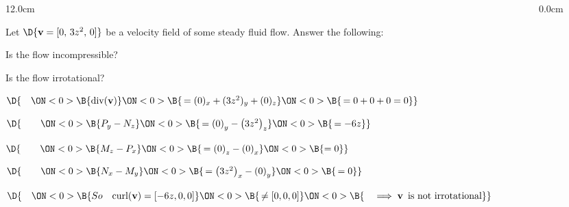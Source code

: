 \begin{frame}
\frametitle{}
\scriptsize
\begin{columns}\begin{column}{12.0cm}

\EX Let $\D{{\bf v} = [0,\, 3z^2,\, 0]}$ be a velocity field of some steady fluid flow.  Answer the following:

\vspace{0.1cm} 

\OBUL Is the flow incompressible?  \quad
{}

\vspace{0.1cm}

\OBUL Is the flow irrotational?  \quad
{}

\vspace{0.1cm}


%

\vspace{0.6cm}

$\D{\quad
\ON<0>{\B{\text{div}({\bf v})}}
\ON<0>{\B{\, = (0)_x + (3z^2)_y + (0)_z}}
\ON<0>{\B{\, = 0 + 0 + 0 = 0}}}$ \quad 
{}

\vspace{0.8cm}

$\D{\qquad
\ON<0>{\B{P_y-N_z }}
\ON<0>{\B{\, = \left(0\right)_y - \left(3z^2\right)_z }}
\ON<0>{\B{\, = -6z}}}$

\vspace{0.3cm}

$\D{\qquad
\ON<0>{\B{M_z-P_x }}
\ON<0>{\B{\,= \left(0\right)_z - \left(0\right)_x }}
\ON<0>{\B{= 0}}}$

\vspace{0.3cm}

$\D{\qquad
\ON<0>{\B{N_x-M_y }}
\ON<0>{\B{\,= \left(3z^2\right)_x - \left(0\right)_y }}
\ON<0>{\B{\,= 0}}}$

\vspace{0.3cm}

$\D{\quad 
\ON<0>{\B{So \quad \text{curl}({\bf v}) = [-6z,0,0] }}
\ON<0>{\B{\, \ne [0,0,0]}}
\ON<0>{\B{\quad \implies {\bf v} \text{\, is not irrotational}}}}$

\vspace{3.2cm}

\end{column}\begin{column}{0.0cm}\end{column}\end{columns}
\end{frame}

